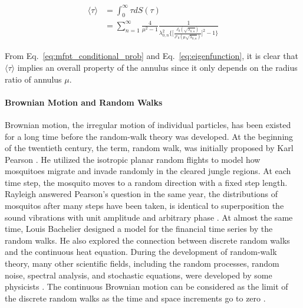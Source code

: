 \begin{equation}\label{eq:mfpt_conditional_prob}
  \begin{split}
    \langle \tau \rangle &= \int_{0}^{\infty} \tau dS(\tau)\\
    &=\sum_{n=1}^{\infty} \frac{4}{\mu^2 - 1}
    \frac{1}{\lambda^2_{0,n}\bigg\{\bigg[\frac{J_0(\sqrt{\lambda_{0,n}})}{J'_0(\mu\sqrt{\lambda_{0,n}})}\bigg]^2
      -1\bigg\}}
  \end{split}
\end{equation}

From Eq.~\ref{eq:mfpt_conditional_prob} and
Eq.~\ref{eq:eigenfunction}, it is clear that $\langle \tau \rangle$
implies an overall property of the annulus since it only depends on
the radius ratio of annulus $\mu$.




\paragraph{Brownian Motion and Random Walks}

Brownian motion, the irregular motion of individual particles, has
been existed for a long time before the random-walk theory was
developed. At the beginning of the twentieth century, the term, random
walk, was initially proposed by Karl
Pearson \cite{pearson1905problem}. He utilized the isotropic planar
random flights to model how mosquitoes migrate and invade randomly in
the cleared jungle regions. At each time step, the mosquito moves to a
random direction with a fixed step
length. Rayleigh \cite{rayleigh1905problem} answered Pearson's
question in the same year, the distributions of mosquitos after many
steps have been taken, is identical to superposition the sound
vibrations with unit amplitude and arbitrary
phase \cite{de2012flying}. At almost the same time, Louis
Bachelier \cite{bachelier1900theorie} designed a model for the
financial time series by the random walks. He also explored the
connection between discrete random walks and the continuous heat
equation. During the development of random-walk theory, many other
scientific fields, including the random processes, random noise,
spectral analysis, and stochastic equations, were developed by some
physicists \cite{einstein1905electrodynamics} \cite{einstein1906theory} \cite{smoluchowski1916drei}. The
continuous Brownian motion can be considered as the limit of the
discrete random walks as the time and space increments go to
zero \cite{lawler2010random}\cite{varadhan1980lectures}.


